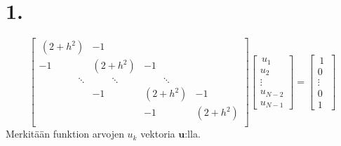 \documentclass{article}
\title{}
\author{Mikael Myyrä}
\date{}
\begin{document}
\section*{1.}

\[
  \begin{bmatrix}
    \,(2 + h^2) & -1 & & \,\\
    -1 & (2 + h^2) & -1 & \\
    \qquad \qquad \ddots & \qquad \ddots & \qquad \ddots \\
    & -1 & (2 + h^2) & -1 \\
    & & -1 & (2 + h^2) \\
  \end{bmatrix}
  \begin{bmatrix}
    \,u_1\, \\ u_2 \\ \vdots \\ u_{N-2} \\ u_{N-1}
  \end{bmatrix}
  =
  \begin{bmatrix}
    \,1\, \\ 0 \\ \vdots \\ 0 \\ 1
  \end{bmatrix}
\]
Merkitään funktion arvojen $u_k$ vektoria $\mathbf{u}$:lla.
\end{document}
